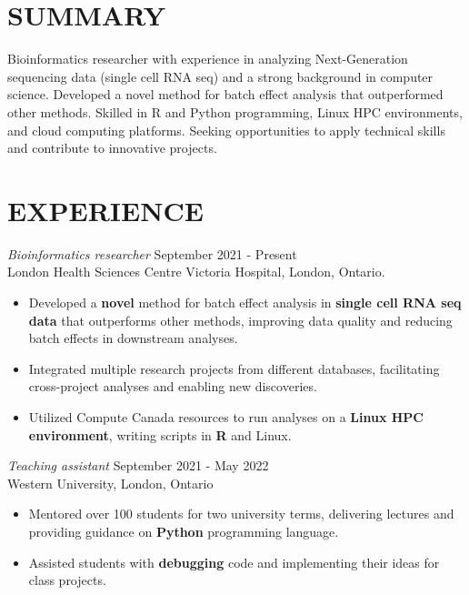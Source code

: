 \documentclass[line, margin]{res}
\begin{document}
\address{London, Ontario \\ 226-577-3101 \\ bjabbar@uwo.ca \\ linkedin.com/in/behnam-jabbarizadeh }

\begin{resume}
  \section{SUMMARY}
  Bioinformatics researcher with experience in analyzing Next-Generation sequencing data (single cell RNA seq) and a strong background in computer science.
  Developed a novel method for batch effect analysis that outperformed other methods.
  Skilled in R and Python programming, Linux HPC environments, and cloud computing platforms.
  Seeking opportunities to apply technical skills and contribute to innovative projects.
  \section{EXPERIENCE}
  {\sl Bioinformatics researcher} \hfill September 2021 - Present \\
  London Health Sciences Centre Victoria Hospital, London, Ontario.\\
  \begin{itemize} \itemsep -2pt
    \item Developed a \textbf{novel} method for batch effect analysis in \textbf{single cell RNA seq data} that outperforms other methods, improving data quality and reducing batch effects in downstream analyses.
    \item Integrated multiple research projects from different databases, facilitating cross-project analyses and enabling new discoveries.
    \item Utilized Compute Canada resources to run analyses on a \textbf{Linux HPC environment}, writing scripts in \textbf{R} and Linux.
  \end{itemize}
  {\sl Teaching assistant} \hfill September 2021 - May 2022 \\
  Western University, London, Ontario
  \begin{itemize} \itemsep -2pt
    \item Mentored over 100 students for two university terms, delivering lectures and providing guidance on \textbf{Python} programming language.
    \item Assisted students with \textbf{debugging} code and implementing their ideas for class projects.
  \end{itemize}

\end{resume}
\end{document}

